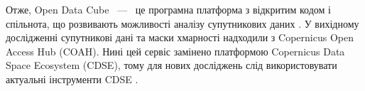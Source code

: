 \clearpage
\chapterConclusion Отже, Open Data Cube ~---~ це програмна %
платформа з відкритим кодом і
спільнота, що розвивають можливості аналізу %
супутникових даних \cite{ref6,ref17}.  У вихідному
дослідженні супутникові дані та маски %
хмарності надходили з Copernicus Open Access Hub
(COAH). Нині цей сервіс замінено платформою Copernicus %
Data Space Ecosystem (CDSE),
тому для нових досліджень слід використовувати %
актуальні інструменти CDSE \cite{ref11,ref16}.
